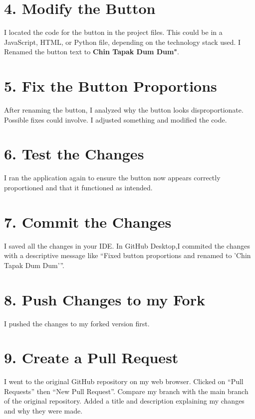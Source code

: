 \documentclass[12pt, a4paper]{article}
\begin{document}
\section*{ 4. Modify the Button}
I located the code for the button in the project files. This could be in a JavaScript, HTML, or Python file, depending on the technology stack used.
I Renamed the button text to \textbf{Chin Tapak Dum Dum"}.
  
\section*{ 5. Fix the Button Proportions}
After renaming the button, I analyzed why the button looks disproportionate. Possible fixes could involve. I adjusted something and modified the code.
\section*{ 6. Test the Changes}
I ran the application again to ensure the button now appears correctly proportioned and that it functioned as intended.

\section*{ 7. Commit the Changes}
I saved all the changes in your IDE.
In GitHub Desktop,I commited the changes with a descriptive message like “Fixed button proportions and renamed to 'Chin Tapak Dum Dum'”.

\newpage
{}
\vspace{-2cm}

\section*{ 8. Push Changes to my Fork}
I pushed the changes to my forked version first.

\section*{9. Create a Pull Request}
I went to the original GitHub repository on my web browser.
Clicked on “Pull Requests” then “New Pull Request”.
Compare my branch with the main branch of the original repository.
Added a title and description explaining my changes and why they were made.
\end{document}
